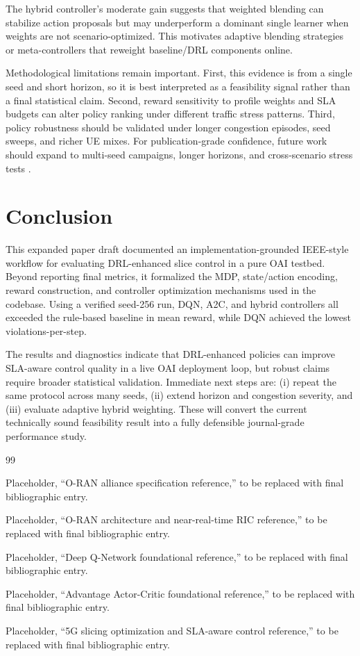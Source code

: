 \documentclass[journal]{IEEEtran}
\begin{document}
The hybrid controller's moderate gain suggests that weighted blending can stabilize action proposals but may underperform a dominant single learner when weights are not scenario-optimized. This motivates adaptive blending strategies or meta-controllers that reweight baseline/DRL components online.

Methodological limitations remain important. First, this evidence is from a single seed and short horizon, so it is best interpreted as a feasibility signal rather than a final statistical claim. Second, reward sensitivity to profile weights and SLA budgets can alter policy ranking under different traffic stress patterns. Third, policy robustness should be validated under longer congestion episodes, seed sweeps, and richer UE mixes. For publication-grade confidence, future work should expand to multi-seed campaigns, longer horizons, and cross-scenario stress tests \cite{ref_dqn,ref_a2c,ref_5g_slicing}.

\section{Conclusion}
This expanded paper draft documented an implementation-grounded IEEE-style workflow for evaluating DRL-enhanced slice control in a pure OAI testbed. Beyond reporting final metrics, it formalized the MDP, state/action encoding, reward construction, and controller optimization mechanisms used in the codebase. Using a verified seed-256 run, DQN, A2C, and hybrid controllers all exceeded the rule-based baseline in mean reward, while DQN achieved the lowest violations-per-step.

The results and diagnostics indicate that DRL-enhanced policies can improve SLA-aware control quality in a live OAI deployment loop, but robust claims require broader statistical validation. Immediate next steps are: (i) repeat the same protocol across many seeds, (ii) extend horizon and congestion severity, and (iii) evaluate adaptive hybrid weighting. These will convert the current technically sound feasibility result into a fully defensible journal-grade performance study.

\begin{thebibliography}{99}

Placeholder, ``O-RAN alliance specification reference,'' to be replaced with final bibliographic entry.

Placeholder, ``O-RAN architecture and near-real-time RIC reference,'' to be replaced with final bibliographic entry.

Placeholder, ``Deep Q-Network foundational reference,'' to be replaced with final bibliographic entry.

Placeholder, ``Advantage Actor-Critic foundational reference,'' to be replaced with final bibliographic entry.

Placeholder, ``5G slicing optimization and SLA-aware control reference,'' to be replaced with final bibliographic entry.

\end{thebibliography}
\end{document}
